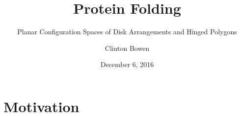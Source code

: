 \documentclass{beamer}
\title[Protein Folding]
{Protein Folding}
\subtitle{Planar Configuration Spaces of Disk Arrangements and
Hinged Polygons}
\author{Clinton Bowen}
\institute
{
  California State University Northridge
}
\date
{December 6, 2016}
\begin{document}
\frame{\titlepage}
\section{Motivation}

\end{document}
